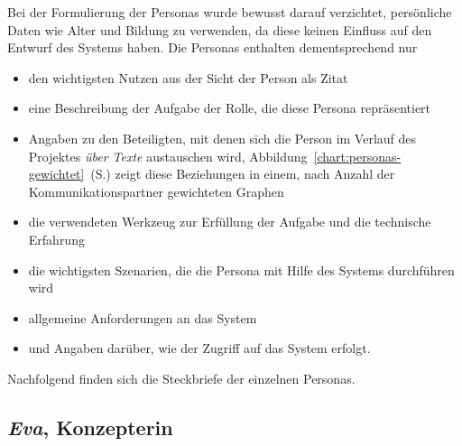 Bei der Formulierung der Personas wurde bewusst darauf verzichtet, persönliche Daten wie Alter und Bildung zu verwenden, da diese keinen Einfluss auf den Entwurf des Systems haben. Die Personas enthalten dementsprechend nur 
\begin{itemize}\itemsep -5pt
\item den wichtigsten Nutzen aus der Sicht der Person als Zitat
\item eine Beschreibung der Aufgabe der Rolle, die diese Persona repräsentiert
\item Angaben zu den Beteiligten, mit denen sich die Person im Verlauf des Projektes \emph{über Texte} austauschen wird, Abbildung~\ref{chart:personas-gewichtet}~(S.\pageref{chart:personas-gewichtet}) zeigt diese Beziehungen in einem, nach Anzahl der Kommunikationspartner gewichteten Graphen
\item die verwendeten Werkzeug zur Erfüllung der Aufgabe und die technische Erfahrung
\item die wichtigsten Szenarien, die die Persona mit Hilfe des Systems durchführen wird
\item allgemeine Anforderungen an das System
\item und Angaben darüber, wie der Zugriff auf das System erfolgt.
\end{itemize}

Nachfolgend finden sich die Steckbriefe der einzelnen Personas. 

\pagebreak

\subsection{\emph{Eva}, Konzepterin}\label{p:eva}

